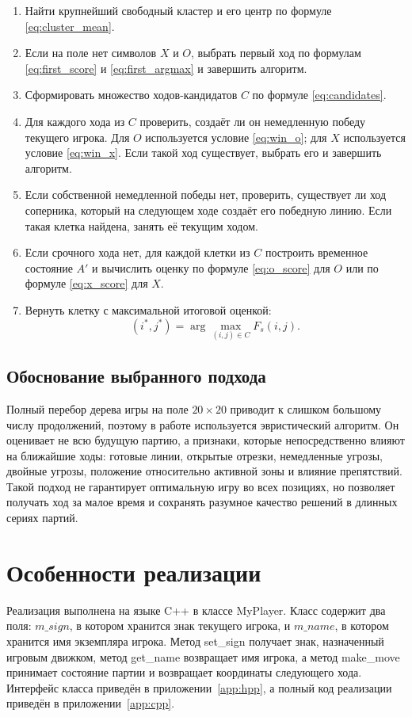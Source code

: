\documentclass[a4paper,14pt]{extarticle}
\begin{document}
\begin{enumerate}
\item Найти крупнейший свободный кластер и его центр по формуле \eqref{eq:cluster_mean}.
\item Если на поле нет символов $X$ и $O$, выбрать первый ход по формулам \eqref{eq:first_score} и \eqref{eq:first_argmax} и завершить алгоритм.
\item Сформировать множество ходов-кандидатов $C$ по формуле \eqref{eq:candidates}.
\item Для каждого хода из $C$ проверить, создаёт ли он немедленную победу текущего игрока. Для $O$ используется условие \eqref{eq:win_o}; для $X$ используется условие \eqref{eq:win_x}. Если такой ход существует, выбрать его и завершить алгоритм.
\item Если собственной немедленной победы нет, проверить, существует ли ход соперника, который на следующем ходе создаёт его победную линию. Если такая клетка найдена, занять её текущим ходом.
\item Если срочного хода нет, для каждой клетки из $C$ построить временное состояние $A'$ и вычислить оценку по формуле \eqref{eq:o_score} для $O$ или по формуле \eqref{eq:x_score} для $X$.
\item Вернуть клетку с максимальной итоговой оценкой:
\[
(i^*,j^*)=\arg\max_{(i,j)\in C} F_s(i,j).
\]
\end{enumerate}

\subsection{Обоснование выбранного подхода}

Полный перебор дерева игры на поле $20 \times 20$ приводит к слишком большому числу продолжений, поэтому в работе используется эвристический алгоритм. Он оценивает не всю будущую партию, а признаки, которые непосредственно влияют на ближайшие ходы: готовые линии, открытые отрезки, немедленные угрозы, двойные угрозы, положение относительно активной зоны и влияние препятствий. Такой подход не гарантирует оптимальную игру во всех позициях, но позволяет получать ход за малое время и сохранять разумное качество решений в длинных сериях партий.

\clearpage
\section{Особенности реализации}

Реализация выполнена на языке C++ в классе MyPlayer. Класс содержит два поля: $m\_sign$, в котором хранится знак текущего игрока, и $m\_name$, в котором хранится имя экземпляра игрока. Метод set\_sign получает знак, назначенный игровым движком, метод get\_name возвращает имя игрока, а метод make\_move принимает состояние партии и возвращает координаты следующего хода. Интерфейс класса приведён в приложении~\ref{app:hpp}, а полный код реализации приведён в приложении~\ref{app:cpp}.
\end{document}
